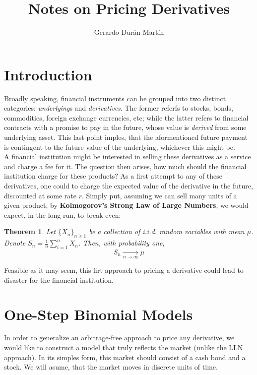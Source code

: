 \documentclass{article}
\title{Notes on Pricing Derivatives}
\author{Gerardo Durán Martín}
\newtheorem{theorem}{Theorem}[section]
\begin{document}
\maketitle


\section{Introduction}
Broadly speaking, financial instruments can be grouped into two distinct categories: \textit{underlying}s and \textit{derivatives}. The former referfs to stocks, bonds, commodities, foreign exchange currencies, etc; while the latter refers to financial contracts with a promise to pay in the future, whose value is \textit{derived} from some underlying asset. This last point imples, that the aformentioned future payment is contingent to the future value of the underlying, whichever this might be.\\

A financial institution might be interested in selling these derivatives as a service and charge a fee for it. The question then arises, how much should the financial institution charge for these products? As a first attempt to  any of these derivatives, one could to charge the expected value of the derivative in the future, discounted at some rate $r$. Simply put, assuming we can sell many units of a given product, by \textbf{Kolmogorov's Strong Law of Large Numbers}, we would expect, in the long run, to break even:

\begin{theorem}
    Let $\{X_n\}_{n\geq 1}$ be a collection of i.i.d. random variables with mean $\mu$. Denote $S_n = \frac{1}{n}\sum_{i=1}^n X_n$. Then, with probability one,
    \begin{equation}
        S_n \xrightarrow[n \rightarrow \infty]{}\mu
    \end{equation}
\end{theorem}


Feasible as it may seem, this firt approach to pricing a derivative could lead to disaster for the financial institution.



\section{One-Step Binomial Models}
In order to generalize an arbitrage-free approach to price any derivative, we would like to construct a model that truly reflects the market (unlike the LLN approach). In its simples form, this market should consist of a cash bond and a stock. We will asume, that the market moves in discrete units of time.\\
\end{document}
